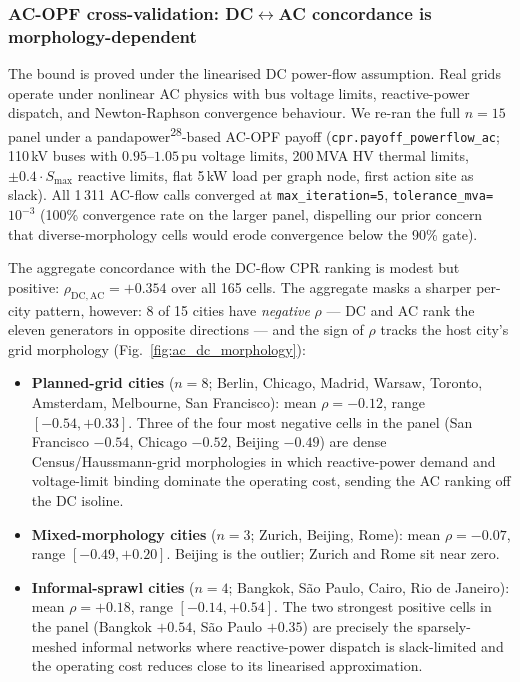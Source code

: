 \documentclass[10pt,a4paper]{article}
\begin{document}
\subsubsection{AC-OPF cross-validation: DC$\leftrightarrow$AC
concordance is morphology-dependent}
\label{sec:ac_opf}

The bound is proved under the linearised DC power-flow assumption.
Real grids operate under nonlinear AC physics with bus voltage
limits, reactive-power dispatch, and Newton-Raphson convergence
behaviour. We re-ran the full $n = 15$ panel under a
pandapower\textsuperscript{28}-based AC-OPF payoff
(\texttt{cpr.payoff\_powerflow\_ac}; 110\,kV buses with
$0.95$--$1.05$\,pu voltage limits, 200\,MVA HV thermal limits,
$\pm 0.4 \cdot S_{\max}$ reactive limits, flat 5\,kW load per
graph node, first action site as slack). All 1\,311 AC-flow calls
converged at \texttt{max\_iteration=5},
\texttt{tolerance\_mva=$10^{-3}$} (100\% convergence rate on the
larger panel, dispelling our prior concern that diverse-morphology
cells would erode convergence below the 90\% gate).

The aggregate concordance with the DC-flow CPR ranking is modest
but positive: $\rho_{\mathrm{DC,AC}} = +0.354$ over all 165 cells.
The aggregate masks a sharper per-city pattern, however: 8 of 15
cities have \emph{negative} $\rho$ --- DC and AC rank the eleven
generators in opposite directions --- and the sign of $\rho$ tracks
the host city's grid morphology
(Fig.~\ref{fig:ac_dc_morphology}):

\begin{itemize}[leftmargin=*,topsep=0pt,itemsep=0pt]
\item \textbf{Planned-grid cities} ($n=8$; Berlin, Chicago, Madrid,
Warsaw, Toronto, Amsterdam, Melbourne, San Francisco): mean
$\rho = -0.12$, range $[-0.54, +0.33]$. Three of the four most
negative cells in the panel (San Francisco $-0.54$, Chicago $-0.52$,
Beijing $-0.49$) are dense Census/Haussmann-grid morphologies in
which reactive-power demand and voltage-limit binding dominate the
operating cost, sending the AC ranking off the DC isoline.
\item \textbf{Mixed-morphology cities} ($n=3$; Zurich, Beijing,
Rome): mean $\rho = -0.07$, range $[-0.49, +0.20]$. Beijing is the
outlier; Zurich and Rome sit near zero.
\item \textbf{Informal-sprawl cities} ($n=4$; Bangkok, S\~ao Paulo,
Cairo, Rio de Janeiro): mean $\rho = +0.18$, range $[-0.14, +0.54]$.
The two strongest positive cells in the panel (Bangkok $+0.54$,
S\~ao Paulo $+0.35$) are precisely the sparsely-meshed informal
networks where reactive-power dispatch is slack-limited and the
operating cost reduces close to its linearised approximation.
\end{itemize}
\end{document}
